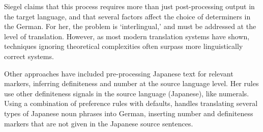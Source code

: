 \documentclass[11pt]{article}
\begin{document}
Siegel claims that this process requires more than just post-processing output in the target language, and that several factors affect the choice of determiners in the German. For her, the problem is `interlingual,' and must be addressed at the level of translation.
However, as most modern translation systems have shown, techniques ignoring theoretical complexities often surpass more linguistically correct systems.

Other approaches have included pre-processing Japanese text for relevant markers, inferring definiteness and number at the source language level.
Her rules use other definiteness signals in the source language (Japanese), like numerals.
Using a combination of preference rules with defaults, handles translating several types of Japanese noun phrases into German, inserting number and definiteness markers that are not given in the Japanese source sentences.
\end{document}
